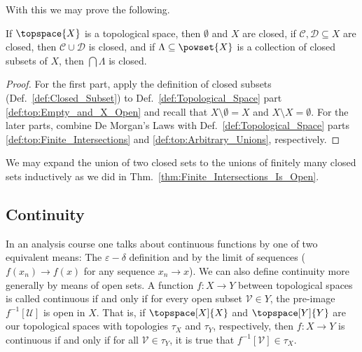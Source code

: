 \documentclass[oneside]{book}                                                  %
\begin{document}
                With this we may prove the following.
                \begin{theorem}
                    If $\topspace{X}$ is a topological space, then $\emptyset$
                    and $X$ are closed, if $\mathcal{C},\mathcal{D}\subseteq{X}$
                    are closed, then $\mathcal{C}\cup\mathcal{D}$ is closed, and
                    if $\Lambda\subseteq\powset{X}$ is a collection of closed
                    subsets of $X$, then $\bigcap\Lambda$ is closed.
                \end{theorem}
                \begin{proof}
                    For the first part, apply the definition of closed subsets
                    (Def.~\ref{def:Closed_Subset}) to
                    Def.~\ref{def:Topological_Space} part
                    \ref{def:top:Empty_and_X_Open} and recall that
                    $X\setminus\emptyset=X$ and $X\setminus{X}=\emptyset$. For
                    the later parts, combine De Morgan's Laws with
                    Def.~\ref{def:Topological_Space} parts
                    \ref{def:top:Finite_Intersections} and
                    \ref{def:top:Arbitrary_Unions}, respectively.
                \end{proof}
                We may expand the union of two closed sets to the unions of
                finitely many closed sets inductively as we did in
                Thm.~\ref{thm:Finite_Intersections_Is_Open}.
            \subsection{Continuity}
                In an analysis course one talks about continuous functions by
                one of two equivalent means: The $\varepsilon-\delta$ definition
                and by the limit of sequences ($f(x_{n})\rightarrow{f}(x)$ for
                any sequence $x_{n}\rightarrow{x}$). We can also define
                continuity more generally by means of open sets. A function
                $f:X\rightarrow{Y}$ between topological spaces is called
                continuous if and only if for every open subset
                $\mathcal{V}\in{Y}$, the pre-image $f^{\minus{1}}[\mathcal{U}]$
                is open in $X$. That is, if $\topspace[X]{X}$ and
                $\topspace[Y]{Y}$ are our topological spaces with topologies
                $\tau_{X}$ and $\tau_{Y}$, respectively, then
                $f:X\rightarrow{Y}$ is continuous if and only if for all
                $\mathcal{V}\in\tau_{Y}$, it is true that
                $f^{\minus{1}}[\mathcal{V}]\in\tau_{X}$.
\end{document}
